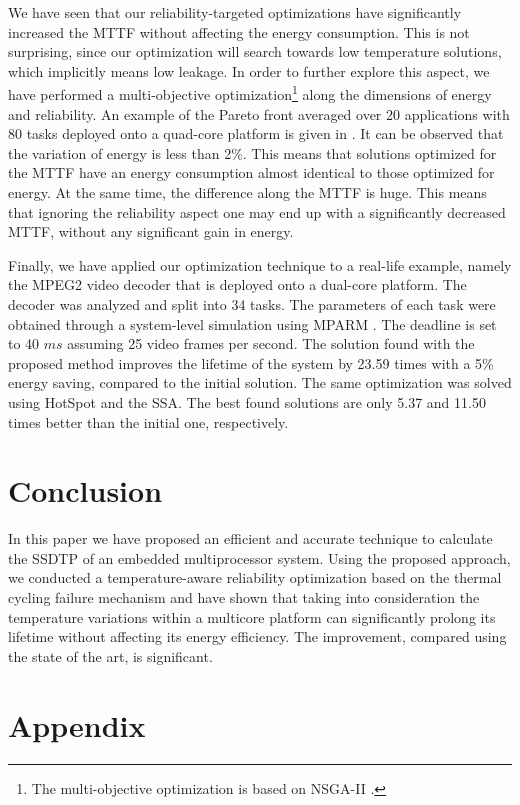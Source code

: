We have seen that our reliability-targeted optimizations have significantly
increased the MTTF without affecting the energy consumption. This is not
surprising, since our optimization will search towards low temperature
solutions, which implicitly means low leakage. In order to further explore this
aspect, we have performed a multi-objective optimization\footnote{The
multi-objective optimization is based on NSGA-II \cite{deb2002}.} along the
dimensions of energy and reliability. An example of the Pareto front averaged
over 20 applications with 80 tasks deployed onto a quad-core platform is given
in . It can be observed that the variation of energy
is less than 2\%. This means that solutions optimized for the MTTF have an
energy consumption almost identical to those optimized for energy. At the same
time, the difference along the MTTF is huge. This means that ignoring the
reliability aspect one may end up with a significantly decreased MTTF, without
any significant gain in energy.

Finally, we have applied our optimization technique to a real-life example,
namely the MPEG2 video decoder \cite{ffmpeg2011} that is deployed onto a
dual-core platform. The decoder was analyzed and split into 34 tasks. The
parameters of each task were obtained through a system-level simulation using
MPARM \cite{benini2005}. The deadline is set to 40 $ms$ assuming 25 video frames
per second. The solution found with the proposed method improves the lifetime of
the system by 23.59 times with a 5\% energy saving, compared to the initial
solution. The same optimization was solved using HotSpot and the SSA. The best
found solutions are only 5.37 and 11.50 times better than the initial one,
respectively.

\section{Conclusion}

In this paper we have proposed an efficient and accurate technique to calculate
the SSDTP of an embedded multiprocessor system. Using the proposed approach, we
conducted a temperature-aware reliability optimization based on the thermal
cycling failure mechanism and have shown that taking into consideration the
temperature variations within a multicore platform can significantly prolong its
lifetime without affecting its energy efficiency. The improvement, compared
using the state of the art, is significant.

\section{Appendix}

